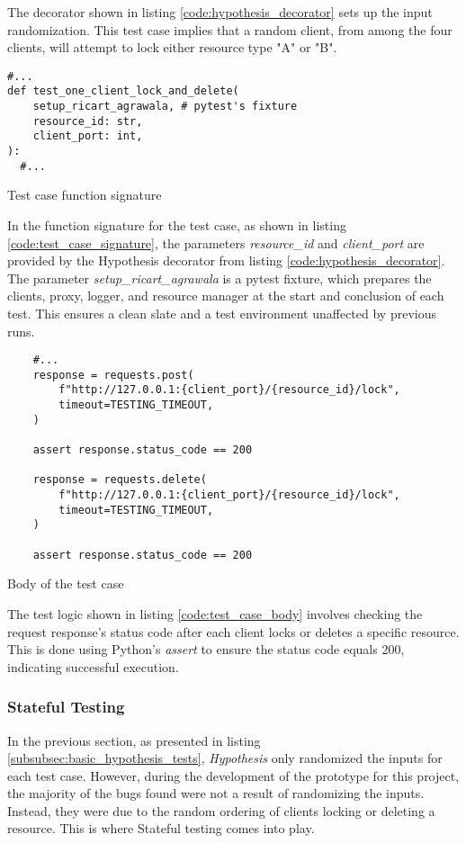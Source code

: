 The decorator shown in listing \ref{code:hypothesis_decorator} sets up the input randomization. This test case implies that a random client, from among the four clients, will attempt to lock either resource type "A" or "B".


\begin{listing}[!ht]
  \begin{verbatim}
#...
def test_one_client_lock_and_delete(
    setup_ricart_agrawala, # pytest's fixture
    resource_id: str,
    client_port: int,
):
  #...
  \end{verbatim}
  \caption{Test case function signature}
  \label{code:test_case_signature}
\end{listing}

In the function signature for the test case, as shown in listing
\ref{code:test_case_signature}, the parameters \textit{resource\_id} and
\textit{client\_port} are provided by the Hypothesis decorator from listing \ref{code:hypothesis_decorator}. 
The parameter \textit{setup\_ricart\_agrawala} is a pytest fixture, which prepares the clients, proxy, logger, and resource manager at the start and conclusion of each test. This ensures a clean slate and a test environment unaffected by previous runs.


\begin{listing}[!ht]
  \begin{verbatim}
    #...
    response = requests.post(
        f"http://127.0.0.1:{client_port}/{resource_id}/lock",
        timeout=TESTING_TIMEOUT,
    )

    assert response.status_code == 200

    response = requests.delete(
        f"http://127.0.0.1:{client_port}/{resource_id}/lock",
        timeout=TESTING_TIMEOUT,
    )

    assert response.status_code == 200
  \end{verbatim}
  \caption{Body of the test case}
  \label{code:test_case_body}
\end{listing}


The test logic shown in listing \ref{code:test_case_body} involves checking the request response's status code after each client locks or deletes a specific resource. This is done using Python's \textit{assert} to ensure the status code equals 200, indicating successful execution.

\subsubsection{Stateful Testing}
\label{subsubsec:stateful_testing}
In the previous section, as presented in listing \ref{subsubsec:basic_hypothesis_tests}, \textit{Hypothesis} only randomized the inputs for each test case. However, during the development of the prototype for this project, the majority of the bugs found were not a result of randomizing the inputs. Instead, they were due to the random ordering of clients locking or deleting a resource. This is where Stateful testing comes into play.

